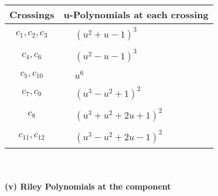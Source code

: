 \documentclass[1p]{elsarticle_modified}
\theoremstyle{definition}
\begin{document}
\begin{tabular}{m{50pt}|m{274pt}}
Crossings & \hspace{64pt}u-Polynomials at each crossing \\
\hline $$\begin{aligned}c_{1},c_{2},c_{3}\end{aligned}$$&$\begin{aligned}
&(u^2+u-1)^3
\end{aligned}$\\
\hline $$\begin{aligned}c_{4},c_{6}\end{aligned}$$&$\begin{aligned}
&(u^2- u-1)^3
\end{aligned}$\\
\hline $$\begin{aligned}c_{5},c_{10}\end{aligned}$$&$\begin{aligned}
&u^6
\end{aligned}$\\
\hline $$\begin{aligned}c_{7},c_{9}\end{aligned}$$&$\begin{aligned}
&(u^3- u^2+1)^2
\end{aligned}$\\
\hline $$\begin{aligned}c_{8}\end{aligned}$$&$\begin{aligned}
&(u^3+u^2+2 u+1)^2
\end{aligned}$\\
\hline $$\begin{aligned}c_{11},c_{12}\end{aligned}$$&$\begin{aligned}
&(u^3- u^2+2 u-1)^2
\end{aligned}$\\
\hline
\end{tabular}\\~\\
\newpage\renewcommand{\arraystretch}{1}
\flushleft \textbf{(v) Riley Polynomials at the component}\newline \\
\end{document}
